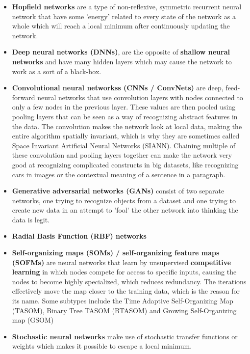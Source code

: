 \begin{itemize}
\begin{itemize}
			\item \textbf{Hopfield networks}
				are a type of non-reflexive, symmetric recurrent neural network that have some 'energy' related to every state of the network as a whole which will reach a local minimum after continuously updating the network.
			\item \textbf{Deep neural networks (DNNs)},
				are the opposite of \textbf{shallow neural networks} and have many hidden layers which may cause the network to work as a sort of a black-box.
			\item \textbf{Convolutional neural networkss (CNNs / ConvNets)}
				are deep, feed-forward neural networks that use convolution layers with nodes connected to only a few nodes in the previous layer. These values are then pooled using pooling layers that can be seen as a way of recognizing abstract features in the data. The convolution makes the network look at local data, making the entire algorithm spatially invariant, which is why they are sometimes called Space Invariant Artificial Neural Networks (SIANN). Chaining multiple of these convolution and pooling layers together can make the network very good at recognizing complicated constructs in big datasets, like recognizing cars in images or the contextual meaning of a sentence in a paragraph.
			\item \textbf{Generative adversarial networks (GANs)}
				consist of two separate networks, one trying to recognize objects from a dataset and one trying to create new data in an attempt to 'fool' the other network into thinking the data is legit.\cite{Li:2013:CAL:2463372.2465801}
			\item \textbf{Radial Basis Function (RBF) networks}
				\cite{rbf}
			\item \textbf{Self-organizing maps (SOMs) / self-organizing feature maps (SOFMs)}
				are neural networks that learn by unsupervised \textbf{competitive learning} in which nodes compete for access to specific inputs, causing the nodes to become highly specialized, which reduces redundancy. The iterations effectively move the map closer to the training data, which is the reason for its name. Some subtypes include the Time Adaptive Self-Organizing Map (TASOM), Binary Tree TASOM (BTASOM) and Growing Self-Organizing map (GSOM)
			\item \textbf{Stochastic neural networks}
				make use of stochastic transfer functions or weights which makes it possible to escape a local minimum. 

\end{itemize}
\end{itemize}
